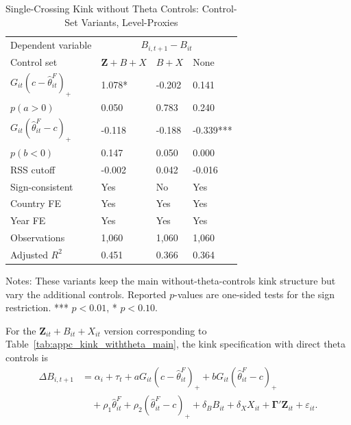\begin{table}[H]\centering
\caption{Single-Crossing Kink without Theta Controls: Control-Set Variants, Level-Proxies}
\label{tab:appc_kink_notheta_controls}
\begin{threeparttable}
\scriptsize
\setlength{\tabcolsep}{3.0pt}
\begin{tabularx}{0.92\textwidth}{lYYY}
\toprule
Dependent variable &  \\
Control set & $\mathbf{Z}+B+X$ & $B+X$ & None \\
\midrule
$G_{it}(c-\widehat\theta^F_{it})_+$ & 1.078* & -0.202 & 0.141 \\
$p(a>0)$ & 0.050 & 0.783 & 0.240 \\
$G_{it}(\widehat\theta^F_{it}-c)_+$ & -0.118 & -0.188 & -0.339*** \\
$p(b<0)$ & 0.147 & 0.050 & 0.000 \\
\midrule
RSS cutoff & -0.002 & 0.042 & -0.016 \\
Sign-consistent & Yes & No & Yes \\
Country FE & Yes & Yes & Yes \\
Year FE & Yes & Yes & Yes \\
Observations & 1,060 & 1,060 & 1,060 \\
Adjusted $R^2$ & 0.451 & 0.366 & 0.364 \\
\bottomrule
\end{tabularx}
\begin{tablenotes}[flushleft]\footnotesize
\item Notes: These variants keep the main without-theta-controls kink structure but vary the additional controls. Reported $p$-values are one-sided tests for the sign restriction. *** $p<0.01$, * $p<0.10$.
\end{tablenotes}
\end{threeparttable}
\end{table}

For the $\mathbf{Z}_{it}+B_{it}+X_{it}$ version corresponding to Table~\ref{tab:appc_kink_withtheta_main}, the kink specification with direct theta controls is
\begin{equation}
\begin{aligned}
\Delta B_{i,t+1}
&=
\alpha_i+\tau_t
+aG_{it}(c-\widehat\theta^F_{it})_+
+bG_{it}(\widehat\theta^F_{it}-c)_+ \\
&\quad
+\rho_1\widehat\theta^F_{it}
+\rho_2(\widehat\theta^F_{it}-c)_+
+\delta_B B_{it}
+\delta_X X_{it}
+\boldsymbol{\Gamma}'\mathbf{Z}_{it}
+\varepsilon_{it}.
\end{aligned}
\label{eq:appc_kink_withtheta_zbx_main}
\end{equation}

